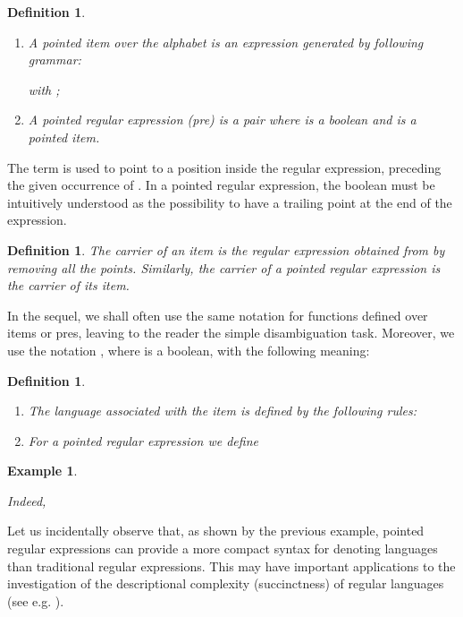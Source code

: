 \documentclass[preprint]{sigplanconf}
\newcounter{item}
\newtheorem{definition}[item]{Definition}
\newtheorem{example}[item]{Example}
\begin{document}
\begin{definition}\ \label{def:pre}
\begin{enumerate}
\item A {\em pointed item} over the alphabet  is 
an expression  generated by following grammar:

with ;
\item A {\em pointed regular expression} (pre) is a pair 
 where  is a boolean and  is a 
pointed item.
\end{enumerate}
\end{definition}
The term  is used to point to a position inside the regular
expression, preceding the given occurrence of . 
In a pointed regular expression, 
the boolean must be intuitively understood as the possibility to have
a trailing point at the end of the expression. 

\begin{definition} \label{def:carrier}
The {\em carrier}  of an item 
is the regular expression obtained from  by removing all the points.
Similarly, the {\em carrier} of a pointed regular expression is the 
carrier of its item.
\end{definition}
In the sequel, we shall often use the same notation for functions
defined over items or pres, leaving to the reader the simple 
disambiguation task. Moreover, we use the notation , where  
is a boolean, with the following meaning:


\begin{definition}\ \label{def:Lp}
\begin{enumerate}
\item The language  associated with the item  is defined by the
following rules:

\item For a pointed regular expression  we define

\end{enumerate}
\end{definition}

\begin{example}
\label{ex:compact}

Indeed,

\end{example}
Let us incidentally observe that, as shown by the previous
example, pointed regular expressions can provide a more compact 
syntax for denoting languages than traditional regular expressions. 
This may have important applications to 
the investigation
of the descriptional complexity (succinctness) of regular languages
(see e.g. \cite{Gelade10, GruberH08, HolzerK09}). 
\end{document}
